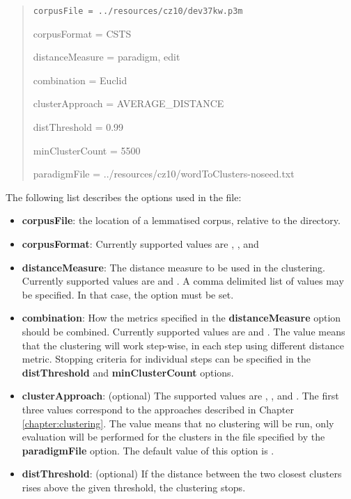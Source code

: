 \begin{quote}
\tt corpusFile = ../resources/cz10/dev37kw.p3m

corpusFormat = CSTS

distanceMeasure = paradigm, edit

combination = Euclid

clusterApproach = AVERAGE\_DISTANCE

distThreshold = 0.99

minClusterCount = 5500

paradigmFile = ../resources/cz10/wordToClusters-noseed.txt
\end{quote}
The following list describes the options used in the file: 
\begin{itemize}
\item \textbf{corpusFile}: the location of a lemmatised corpus, relative to the  directory.

\item \textbf{corpusFormat}: Currently supported values are , ,  and 

\item \textbf{distanceMeasure}: The distance measure to be used in the clustering. Currently supported values are  and . A comma delimited list of values may be specified. In that case, the  option must be set.

\item \textbf{combination}: How the metrics specified in the \textbf{distanceMeasure} option should be combined. Currently supported values are  and . The value  means that the clustering will work step-wise, in each step using different distance metric. Stopping criteria for individual steps can be specified in the \textbf{distThreshold} and \textbf{minClusterCount} options.

\item \textbf{clusterApproach}: (optional) The supported values are , ,  and . The fir\-st three values correspond to the approaches described in Chapter \ref{chapter:clustering}. The value  means that no clustering will be run, only evaluation will be performed for the clusters in the file specified by the \textbf{paradigmFile} option. The default value of this option is .

\item \textbf{distThreshold}: (optional) If the distance between the two closest clusters rises above the given threshold, the clustering stops.


\end{itemize}
